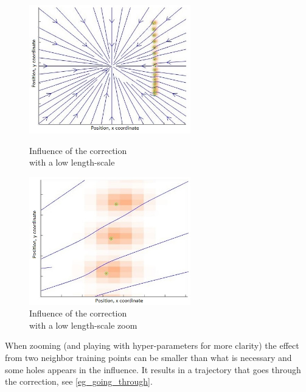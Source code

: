 \begin{figure}[H]
    \begin{minipage}{0.5\linewidth}
        \centering
        \includegraphics[width=7cm]{img/influence_small_GP.jpg}
        \caption{Influence of the correction\\\hspace{0cm}with a low length-scale}
        \label{low_influence}
    \end{minipage}
    \begin{minipage}{0.5\linewidth}
      \centering
      \includegraphics[width=7cm]{img/influence_small_GPzoomed.jpg}
      \caption{Influence of the correction\\\hspace{0cm}with a low length-scale zoom}
      \label{low_influence_zoom}
    \end{minipage}\hfill
\end{figure}


When zooming (and playing with hyper-parameters for more clarity) the effect from two neighbor training points can be smaller than what is necessary and some holes appears in the influence. It results in a trajectory that goes through the correction, see \autoref{eg_going_through}.\\

